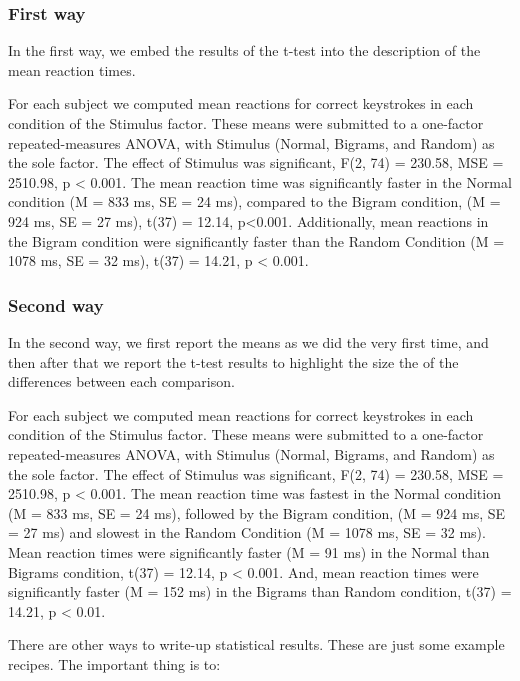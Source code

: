 \documentclass[
]{book}
\begin{document}
\hypertarget{first-way}{%
\subsubsection{First way}\label{first-way}}

In the first way, we embed the results of the t-test into the description of the mean reaction times.

For each subject we computed mean reactions for correct keystrokes in each condition of the Stimulus factor. These means were submitted to a one-factor repeated-measures ANOVA, with Stimulus (Normal, Bigrams, and Random) as the sole factor. The effect of Stimulus was significant, F(2, 74) = 230.58, MSE = 2510.98, p \textless{} 0.001. The mean reaction time was significantly faster in the Normal condition (M = 833 ms, SE = 24 ms), compared to the Bigram condition, (M = 924 ms, SE = 27 ms), t(37) = 12.14, p\textless0.001. Additionally, mean reactions in the Bigram condition were significantly faster than the Random Condition (M = 1078 ms, SE = 32 ms), t(37) = 14.21, p \textless{} 0.001.

\hypertarget{second-way}{%
\subsubsection{Second way}\label{second-way}}

In the second way, we first report the means as we did the very first time, and then after that we report the t-test results to highlight the size the of the differences between each comparison.

For each subject we computed mean reactions for correct keystrokes in each condition of the Stimulus factor. These means were submitted to a one-factor repeated-measures ANOVA, with Stimulus (Normal, Bigrams, and Random) as the sole factor. The effect of Stimulus was significant, F(2, 74) = 230.58, MSE = 2510.98, p \textless{} 0.001. The mean reaction time was fastest in the Normal condition (M = 833 ms, SE = 24 ms), followed by the Bigram condition, (M = 924 ms, SE = 27 ms) and slowest in the Random Condition (M = 1078 ms, SE = 32 ms). Mean reaction times were significantly faster (M = 91 ms) in the Normal than Bigrams condition, t(37) = 12.14, p \textless{} 0.001. And, mean reaction times were significantly faster (M = 152 ms) in the Bigrams than Random condition, t(37) = 14.21, p \textless{} 0.01.

There are other ways to write-up statistical results. These are just some example recipes. The important thing is to:
\end{document}
